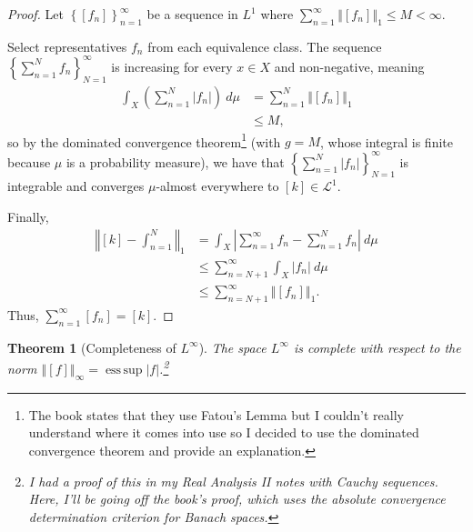 \documentclass[12pt]{extarticle}
\newcommand{\norm}[1]{\left\Vert #1\right\Vert}
\newcommand{\set}[1]{\left\{#1\right\}}
\DeclareMathOperator*{\esssup}{ess\,sup}
\theoremstyle{plain}
\newtheorem*{theorem}{Theorem}
\theoremstyle{definition}
\theoremstyle{note}
\renewcommand{\newline}{\hfill\break}
\begin{document}
\begin{proof}
  Let $\set{\left[f_n\right]}_{n=1}^{\infty}$ be a sequence in $L^{1}$ where $\sum_{n=1}^{\infty}\norm{[f_n]}_1 \leq M < \infty$.\newline

   Select representatives $f_n$ from each equivalence class. The sequence $\set{\sum_{n=1}^{N}f_n}_{N=1}^{\infty}$ is increasing for every $x\in X$ and non-negative, meaning
   \begin{align*}
     \int_{X}\left(\sum_{n=1}^{N}|f_n|\right)\:d\mu &= \sum_{n=1}^{N}\norm{[f_n]}_{1}\\
                                                    &\leq M,
   \end{align*}
   so by the dominated convergence theorem\footnote{The book states that they use Fatou's Lemma but I couldn't really understand where it comes into use so I decided to use the dominated convergence theorem and provide an explanation.} (with $g = M$, whose integral is finite because $\mu$ is a probability measure), we have that $\set{\sum_{n=1}^{N}|f_n|}_{N=1}^{\infty}$ is integrable and converges $\mu$-almost everywhere to $[k]\in \mathcal{L}^{1}$.\newline

   Finally,
   \begin{align*}
     \norm{[k] - \int_{n=1}^{N}}_{1} &= \int_{X}^{} \left\vert \sum_{n=1}^{\infty}f_n - \sum_{n=1}^{N}f_n \right\vert\:d\mu\\
                                     &\leq \sum_{n=N+1}^{\infty}\int_{X}^{} \left\vert f_n \right\vert\:d\mu\\
                                     &\leq \sum_{n=N+1}^{\infty}\norm{[f_n]}_1.
   \end{align*}
   Thus, $\sum_{n=1}^{\infty}[f_n] = [k]$.
\end{proof}
\begin{theorem}[Completeness of $L^{\infty}$]
  The space $L^{\infty}$ is complete with respect to the norm $\norm{[f]}_{\infty} = \esssup |f|$.\footnote{I had a proof of this in my Real Analysis II notes with Cauchy sequences. Here, I'll be going off the book's proof, which uses the absolute convergence determination criterion for Banach spaces.}
\end{theorem}
\end{document}
